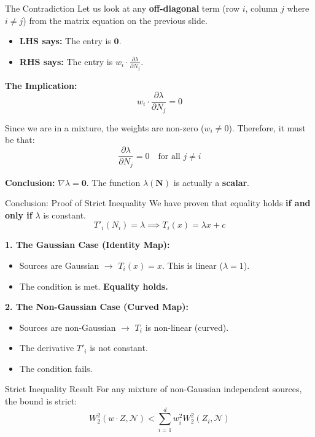 \documentclass{beamer}
\begin{document}
\begin{frame}{The Contradiction}
  Let us look at any \textbf{off-diagonal} term (row $i$, column $j$ where $i \neq j$) from the matrix equation on the previous slide.
  
  \begin{itemize}
      \item \textbf{LHS says:} The entry is $\mathbf{0}$.
      \item \textbf{RHS says:} The entry is $w_i \cdot \frac{\partial \lambda}{\partial N_j}$.
  \end{itemize}
  
  \textbf{The Implication:}
  \[ w_i \cdot \frac{\partial \lambda}{\partial N_j} = 0 \]
  
  Since we are in a mixture, the weights are non-zero ($w_i \neq 0$). Therefore, it must be that:
  \[ \frac{\partial \lambda}{\partial N_j} = 0 \quad \text{for all } j \neq i \]
  
  \textbf{Conclusion:} $\nabla \lambda = \mathbf{0}$. The function $\lambda(\mathbf{N})$ is actually a \textbf{scalar}.
\end{frame}

\begin{frame}{Conclusion: Proof of Strict Inequality}
  We have proven that equality holds \textbf{if and only if} $\lambda$ is constant.
  \[ T'_i(N_i) = \lambda \implies T_i(x) = \lambda x + c \]
  
  \vspace{0.2cm}
  \textbf{1. The Gaussian Case (Identity Map):}
  \begin{itemize}
      \item Sources are Gaussian $\to$ $T_i(x) = x$. This is linear ($\lambda=1$).
      \item The condition is met. \textbf{Equality holds.}
  \end{itemize}
  
  \textbf{2. The Non-Gaussian Case (Curved Map):}
  \begin{itemize}
      \item Sources are non-Gaussian $\to$ $T_i$ is non-linear (curved).
      \item The derivative $T'_i$ is not constant.
      \item The condition fails.
  \end{itemize}
  
  \begin{alertblock}{Strict Inequality Result}
  For any mixture of non-Gaussian independent sources, the bound is strict:
  \[
    W_2^2(w \cdot Z, \mathcal{N}) < \sum_{i=1}^d w_i^2 W_2^2(Z_i, \mathcal{N})
  \]
  \end{alertblock}
\end{frame}
\end{document}
